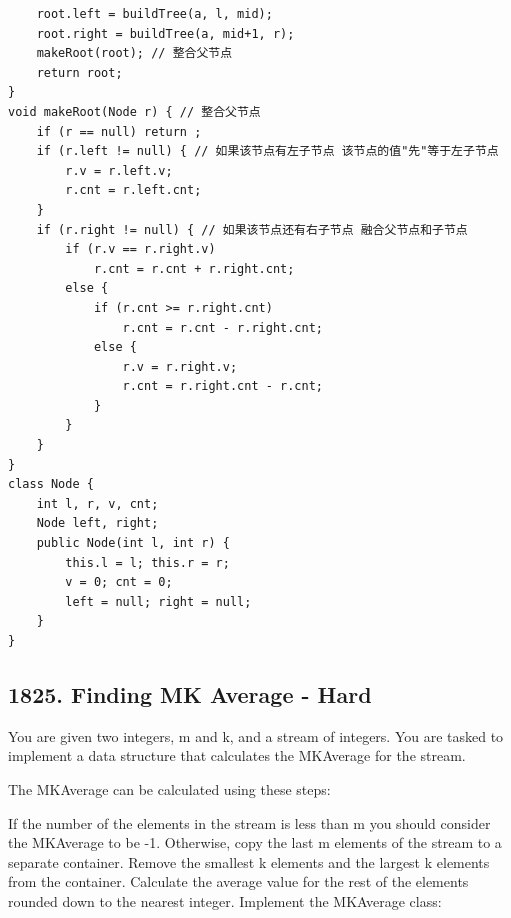 \documentclass[9pt, b5paaper]{book}
\begin{document}
\begin{enumerate}
\begin{verbatim}
    root.left = buildTree(a, l, mid);
    root.right = buildTree(a, mid+1, r);
    makeRoot(root); // 整合父节点
    return root;
}
void makeRoot(Node r) { // 整合父节点
    if (r == null) return ;
    if (r.left != null) { // 如果该节点有左子节点 该节点的值"先"等于左子节点
        r.v = r.left.v;
        r.cnt = r.left.cnt;
    }
    if (r.right != null) { // 如果该节点还有右子节点 融合父节点和子节点
        if (r.v == r.right.v)
            r.cnt = r.cnt + r.right.cnt;
        else {
            if (r.cnt >= r.right.cnt)
                r.cnt = r.cnt - r.right.cnt;
            else {
                r.v = r.right.v;
                r.cnt = r.right.cnt - r.cnt;
            }
        }
    }
}
class Node {
    int l, r, v, cnt;
    Node left, right;
    public Node(int l, int r) {
        this.l = l; this.r = r;
        v = 0; cnt = 0;
        left = null; right = null;
    }
}
\end{verbatim}
\end{enumerate}

\subsection{1825. Finding MK Average - Hard}
\label{sec-1-0-2}
You are given two integers, m and k, and a stream of integers. You are tasked to implement a data structure that calculates the MKAverage for the stream.

The MKAverage can be calculated using these steps:

If the number of the elements in the stream is less than m you should consider the MKAverage to be -1. Otherwise, copy the last m elements of the stream to a separate container.
Remove the smallest k elements and the largest k elements from the container.
Calculate the average value for the rest of the elements rounded down to the nearest integer.
Implement the MKAverage class:
\end{document}
